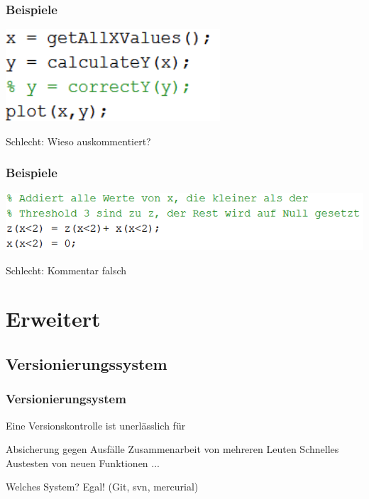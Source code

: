 \documentclass[handout]{beamer}
\begin{document}
\begin{frame}
    \frametitle{Beispiele}
        \begin{center}
    \includegraphics[width=0.6\textwidth]{pictures/Kommentare4.PNG}

    \pause
    \vspace{2em}
            \huge \color{red} Schlecht: Wieso auskommentiert?
        \end{center}
\end{frame}
\begin{frame}
    \frametitle{Beispiele}
        \begin{center}
    \includegraphics[width=\textwidth]{pictures/Kommentare5.PNG}

    \pause
    \vspace{2em}
            \huge \color{red} Schlecht: Kommentar falsch
        \end{center}
\end{frame}


\section{Erweitert}
\begin{frame}
    \tableofcontents[currentsection]
\end{frame}
\subsection{Versionierungssystem}
\begin{frame}
    \frametitle{Versionierungsystem}

    Eine Versionskontrolle ist unerlässlich für
    \begin{outline}
        \1 Absicherung gegen Ausfälle
        \1 Zusammenarbeit von mehreren Leuten
        \1 Schnelles Austesten von neuen Funktionen
        \1 ...
    \end{outline} \pause

    \vspace{2em}Welches System?\hspace{3em}
    \pause 
    Egal! (Git, svn, mercurial)
\end{frame}
\end{document}
